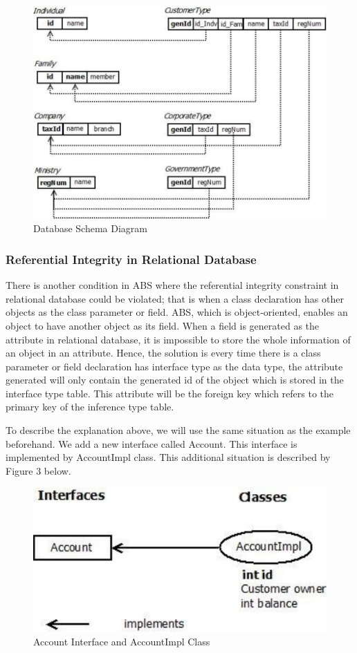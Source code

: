 \documentclass[conference]{IEEEtran}
\begin{document}
\begin{figure}
	\centering
	\includegraphics[scale=0.5]{db1.pdf}
	\caption{Database Schema Diagram}
	\label{figure2}
\end{figure}

\subsubsection{Referential Integrity in Relational Database}
There is another condition in ABS where the referential integrity constraint in relational database could be violated; that is when a class declaration has other objects as the class parameter or field. ABS, which is object-oriented, enables an object to have another object as its field. When a field is generated as the attribute in relational database, it is impossible to store the whole information of an object in an attribute. Hence, the solution is every time there is a class parameter or field declaration has interface type as the data type, the attribute generated will only contain the generated id of the object which is stored in the interface type table. This attribute will be the foreign key which refers to the primary key of the inference type table.

To describe the explanation above, we will use the same situation as the example beforehand. We add a new interface called Account. This interface is implemented by AccountImpl class. This additional situation is described by Figure 3 below.

\begin{figure}
	\centering
	\includegraphics[scale=0.6]{sample2.pdf}
	\caption{Account Interface and AccountImpl Class}
	\label{figure3}
\end{figure}
\end{document}
